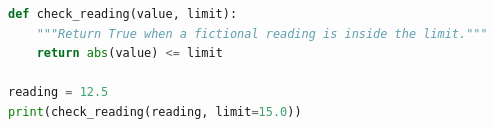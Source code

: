 \begin{lstlisting}[language=Python,caption={示例代码：只演示排版},label={lst:demo}]
def check_reading(value, limit):
    """Return True when a fictional reading is inside the limit."""
    return abs(value) <= limit

reading = 12.5
print(check_reading(reading, limit=15.0))
\end{lstlisting}
